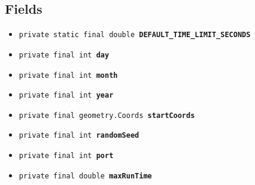 \documentclass[11pt,a4paper]{report}
\makeatletter
\newcommand{\refdefined}[1]{
\expandafter\ifx\csname r@#1\endcsname\relax
\relax\else
{$($in \ref{#1}, page \pageref{#1}$)$}\fi}
\makeatother
\begin{document}
{{{{{{{{{\subsection{Fields}{
\begin{itemize}
\item{
\label{uk.ac.ed.inf.aqmaps.Settings.DEFAULT_TIME_LIMIT_SECONDS}\hypertarget{uk.ac.ed.inf.aqmaps.Settings.DEFAULT_TIME_LIMIT_SECONDS}{\texttt{private static final double\ {\bf  DEFAULT\_TIME\_LIMIT\_SECONDS}}
}
}
\item{
\label{uk.ac.ed.inf.aqmaps.Settings.day}\hypertarget{uk.ac.ed.inf.aqmaps.Settings.day}{\texttt{private final int\ {\bf  day}}
}
}
\item{
\label{uk.ac.ed.inf.aqmaps.Settings.month}\hypertarget{uk.ac.ed.inf.aqmaps.Settings.month}{\texttt{private final int\ {\bf  month}}
}
}
\item{
\label{uk.ac.ed.inf.aqmaps.Settings.year}\hypertarget{uk.ac.ed.inf.aqmaps.Settings.year}{\texttt{private final int\ {\bf  year}}
}
}
\item{
\label{uk.ac.ed.inf.aqmaps.Settings.startCoords}\hypertarget{uk.ac.ed.inf.aqmaps.Settings.startCoords}{\texttt{private final geometry.Coords\ {\bf  startCoords}}
}
}
\item{
\label{uk.ac.ed.inf.aqmaps.Settings.randomSeed}\hypertarget{uk.ac.ed.inf.aqmaps.Settings.randomSeed}{\texttt{private final int\ {\bf  randomSeed}}
}
}
\item{
\label{uk.ac.ed.inf.aqmaps.Settings.port}\hypertarget{uk.ac.ed.inf.aqmaps.Settings.port}{\texttt{private final int\ {\bf  port}}
}
}
\item{
\label{uk.ac.ed.inf.aqmaps.Settings.maxRunTime}\hypertarget{uk.ac.ed.inf.aqmaps.Settings.maxRunTime}{\texttt{private final double\ {\bf  maxRunTime}}
}
}
\end{itemize}
}
}}}}}}}}}
\end{document}
